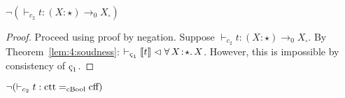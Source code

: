 \begin{theorem}
    \label{lem:4:logical_consistency}
    $\neg (\vdash_{c_2} t : (X : \star) \to_0 X_\square)$
\end{theorem}
\begin{proof}
    Proceed using proof by negation.
    Suppose $\vdash_{c_2} t : (X : \star) \to_0 X_\square$.
    By Theorem~\ref{lem:4:soudness}: $\vdash_{\oldced} \sema{t} \chck \abs{\forall}{X}{\star}{X}$.
    However, this is impossible by consistency of $\oldced$.
\end{proof}

\begin{corollary}
    \label{lem:4:eq_consistency}
    $\neg (\vdash_{c_2} t : \textnormal{ctt} =_{\textnormal{cBool}} \textnormal{cff})$
\end{corollary}
